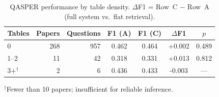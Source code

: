 \begin{table}[t]
  \centering
  \caption{QASPER performance by table density. $\Delta$F1 = Row~C $-$ Row~A (full system vs.\ flat retrieval).}
  \label{tab:table-density}
  \begin{tabular}{l r r c c c c}
    \toprule
    Tables & Papers & Questions & F1 (A) & F1 (C) & $\Delta$F1 & $p$ \\
    \midrule
    0 & 268 & 957 & 0.462 & 0.464 & +0.002 & 0.489 \\
    1--2 & 11 & 42 & 0.318 & 0.331 & +0.013 & 0.812 \\
    3+$^\dagger$ & 2 & 6 & 0.436 & 0.433 & -0.003 & --- \\
    \bottomrule
  \end{tabular}
  \vspace{2pt}
  {\footnotesize $^\dagger$Fewer than 10 papers; insufficient for reliable inference.}
\end{table}
